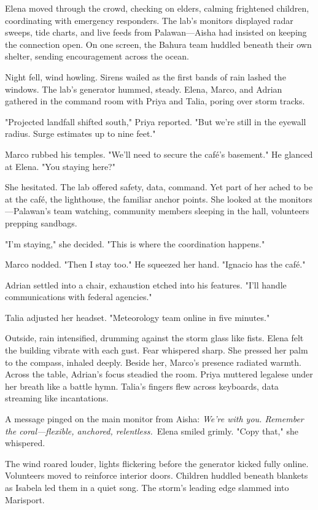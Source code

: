 Elena moved through the crowd, checking on elders, calming frightened children, coordinating with emergency responders. The lab's monitors displayed radar sweeps, tide charts, and live feeds from Palawan—Aisha had insisted on keeping the connection open. On one screen, the Bahura team huddled beneath their own shelter, sending encouragement across the ocean.

Night fell, wind howling. Sirens wailed as the first bands of rain lashed the windows. The lab's generator hummed, steady. Elena, Marco, and Adrian gathered in the command room with Priya and Talia, poring over storm tracks.

"Projected landfall shifted south," Priya reported. "But we're still in the eyewall radius. Surge estimates up to nine feet."

Marco rubbed his temples. "We'll need to secure the café's basement." He glanced at Elena. "You staying here?"

She hesitated. The lab offered safety, data, command. Yet part of her ached to be at the café, the lighthouse, the familiar anchor points. She looked at the monitors—Palawan's team watching, community members sleeping in the hall, volunteers prepping sandbags.

"I'm staying," she decided. "This is where the coordination happens."

Marco nodded. "Then I stay too." He squeezed her hand. "Ignacio has the café."

Adrian settled into a chair, exhaustion etched into his features. "I'll handle communications with federal agencies."

Talia adjusted her headset. "Meteorology team online in five minutes."

Outside, rain intensified, drumming against the storm glass like fists. Elena felt the building vibrate with each gust. Fear whispered sharp. She pressed her palm to the compass, inhaled deeply. Beside her, Marco's presence radiated warmth. Across the table, Adrian's focus steadied the room. Priya muttered legalese under her breath like a battle hymn. Talia's fingers flew across keyboards, data streaming like incantations.

A message pinged on the main monitor from Aisha: \textit{We're with you. Remember the coral—flexible, anchored, relentless.}\ Elena smiled grimly. "Copy that," she whispered.

The wind roared louder, lights flickering before the generator kicked fully online. Volunteers moved to reinforce interior doors. Children huddled beneath blankets as Isabela led them in a quiet song. The storm's leading edge slammed into Marisport.


